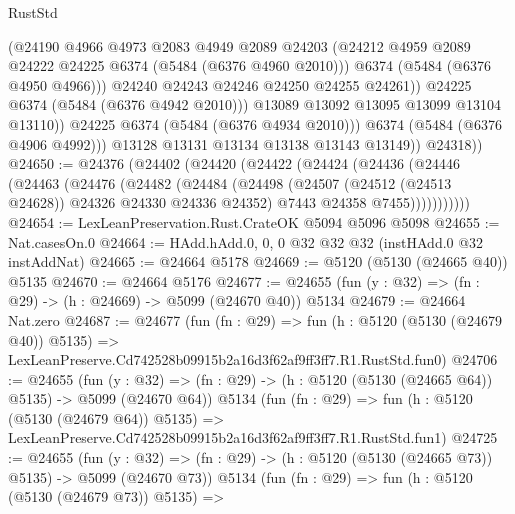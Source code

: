 \begin{lexlean}{RustStd}
\begin{coremodule}
                          (@24190
                            @4966
                            @4973
                            @2083
                            @4949
                            @2089
                            @24203
                            (@24212 @4959 @2089 @24222 @24225 @6374 (@5484 (@6376 @4960 @2010)))
                            @6374
                            (@5484 (@6376 @4950 @4966)))
                          @24240
                          @24243
                          @24246
                          @24250
                          @24255
                          @24261))
                      @24225
                      @6374
                      (@5484 (@6376 @4942 @2010)))
                    @13089
                    @13092
                    @13095
                    @13099
                    @13104
                    @13110))
                @24225
                @6374
                (@5484 (@6376 @4934 @2010)))
              @6374
              (@5484 (@6376 @4906 @4992)))
            @13128
            @13131
            @13134
            @13138
            @13143
            @13149))
        @24318))
@24650 := @24376
    (@24402
      (@24420
        (@24422
          (@24424
            (@24436
              (@24446
                (@24463
                  (@24476
                    (@24482
                      (@24484
                        (@24498
                          (@24507 (@24512 (@24513 @24628)) @24326 @24330 @24336 @24352)
                          @7443
                          @24358
                          @7455)))))))))))
@24654 := LexLeanPreservation.Rust.CrateOK @5094 @5096 @5098
@24655 := Nat.casesOn.{0}
@24664 := HAdd.hAdd.{0, 0, 0} @32 @32 @32 (instHAdd.{0} @32 instAddNat)
@24665 := @24664 @5178
@24669 := @5120 (@5130 (@24665 @40)) @5135
@24670 := @24664 @5176
@24677 := @24655 (fun (y : @32) => (fn : @29) -> (h : @24669) -> @5099 (@24670 @40)) @5134
@24679 := @24664 Nat.zero
@24687 := @24677
    (fun (fn : @29) =>
    fun (h : @5120 (@5130 (@24679 @40)) @5135) =>
    LexLeanPreserve.Cd742528b09915b2a16d3f62af9ff3ff7.R1.RustStd.fun0)
@24706 := @24655
    (fun (y : @32) => (fn : @29) -> (h : @5120 (@5130 (@24665 @64)) @5135) -> @5099 (@24670 @64))
    @5134
    (fun (fn : @29) =>
    fun (h : @5120 (@5130 (@24679 @64)) @5135) =>
    LexLeanPreserve.Cd742528b09915b2a16d3f62af9ff3ff7.R1.RustStd.fun1)
@24725 := @24655
    (fun (y : @32) => (fn : @29) -> (h : @5120 (@5130 (@24665 @73)) @5135) -> @5099 (@24670 @73))
    @5134
    (fun (fn : @29) =>
    fun (h : @5120 (@5130 (@24679 @73)) @5135) =>

\end{coremodule}
\end{lexlean}
